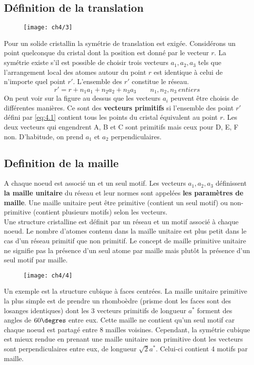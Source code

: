 	\subsection{Définition de la translation}
		\begin{wrapfigure}[5]{l}{6.5cm}
		\vspace{-5mm}
		\texttt{[image: ch4/3]}
		\end{wrapfigure}		
		Pour un solide cristallin la symétrie de translation est exigée. Considérons un point quelconque du cristal dont la position est donné par le vecteur $r$. La symétrie existe s'il est possible de choisir trois vecteurs $a_1,a_2, a_3$ tels que l'arrangement local des atomes autour du point $r$ est identique à celui de n'importe quel point $r'$. L'ensemble des $r'$ constitue le réseau. 
		\begin{equation}
			r' = r + n_1a_1 + n_2a_2 + n_3a_3 \qquad n_1,n_2,n_3 \ entiers 
			\label{eq:4.1}
		\end{equation}		 
		On peut voir sur la figure au dessus que les vecteurs $a_i$ peuvent être choisis de différentes manières. Ce sont des \textbf{vecteurs primitifs} si l'ensemble des point $r'$ défini par \autoref{eq:4.1} contient tous les points du cristal équivalent au point $r$. Les deux vecteurs qui engendrent A, B et C sont primitifs mais ceux pour D, E, F non. D'habitude, on prend $a_1$ et $a_2$ perpendiculaires.
		
		
	\subsection{Definition de la maille} 
		A chaque noeud est associé un et un seul motif. Les vecteurs $a_1,a_2,a_3$ définissent \textbf{la maille unitaire} du réseau et leur normes sont appelées \textbf{les paramètres de maille}. Une maille unitaire peut être primitive (contient un seul motif) ou non-primitive (contient plusieurs motifs) selon les vecteurs. \\
		Une structure cristalline est définit par un réseau et un motif associé à chaque noeud. Le nombre d'atomes contenu dans la maille unitaire est plus petit dans le cas d'un réseau primitif que non primitif. Le concept de maille primitive unitaire ne signifie pas la présence d'un seul atome par maille mais plutôt la présence d'un seul motif par maille. \\
		
		\begin{wrapfigure}[5]{l}{6cm}
		\vspace{-5mm}
		\texttt{[image: ch4/4]}
		\end{wrapfigure}		
		Un exemple est la structure cubique à faces centrées. La maille unitaire primitive la plus simple est de prendre un rhomboèdre (prisme dont les faces sont des losanges identiques) dont les 3 vecteurs primitifs de longueur $a^*$ forment des angles de $60\degres$ entre eux. Cette maille ne contient qu'un seul motif car chaque noeud est partagé entre 8 mailles voisines. Cependant, la symétrie cubique est mieux rendue en prenant une maille unitaire non primitive dont les vecteurs sont perpendiculaires entre eux, de longueur $\sqrt{2}a^*$. Celui-ci contient 4 motifs par maille.
	
